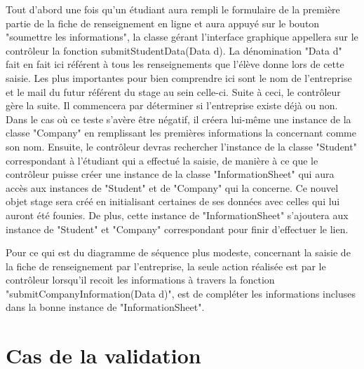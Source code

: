 \documentclass{scrreprt}
\begin{document}
Tout d'abord une fois qu'un étudiant aura rempli le formulaire de la première partie de la fiche de renseignement en ligne et aura
appuyé sur le bouton "soumettre les informations", la classe gérant l'interface graphique appellera sur le contrôleur la fonction 
submitStudentData(Data d). La dénomination "Data d" fait en fait ici référent à tous les renseignements que l'élève donne lors de 
cette saisie. Les plus importantes pour bien comprendre ici sont le nom de l'entreprise et le mail du futur référent du stage au sein
celle-ci. Suite à ceci, le contrôleur gère la suite. Il commencera par déterminer si l'entreprise existe déjà ou non. Dans le cas où
ce teste s'avère être négatif, il créera lui-même une instance de la classe "Company" en remplissant les premières informations la 
concernant comme son nom. Ensuite, le contrôleur devras rechercher l'instance de la classe "Student" correspondant à l'étudiant qui
a effectué la saisie, de manière à ce que le contrôleur puisse créer une instance de la classe "InformationSheet" qui aura accès aux instances
de "Student" et de "Company" qui la concerne. Ce nouvel objet stage sera créé en initialisant certaines de ses données avec celles qui lui
auront été founies. De plus, cette instance de "InformationSheet" s'ajoutera aux instance de "Student" et "Company" correspondant pour finir 
d'effectuer le lien.

\newpage

Pour ce qui est du diagramme de séquence plus modeste, concernant la saisie de la fiche de renseignement par l'entreprise, 
la seule action réalisée est par le contrôleur lorsqu'il recoit les informations à travers la fonction "submitCompanyInformation(Data d)",
est de compléter les informations incluses dans la bonne instance de "InformationSheet".


\newpage
\section{Cas de la validation}
\end{document}
